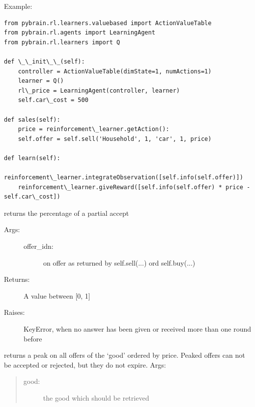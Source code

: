 \documentclass[letterpaper,10pt,english]{sphinxmanual}
\begin{document}
\begin{fulllineitems}
\begin{fulllineitems}
Example:

\begin{Verbatim}[commandchars=\\\{\}]
from pybrain.rl.learners.valuebased import ActionValueTable
from pybrain.rl.agents import LearningAgent
from pybrain.rl.learners import Q

def \_\_init\_\_(self):
    controller = ActionValueTable(dimState=1, numActions=1)
    learner = Q()
    rl\_price = LearningAgent(controller, learner)
    self.car\_cost = 500

def sales(self):
    price = reinforcement\_learner.getAction():
    self.offer = self.sell('Household', 1, 'car', 1, price)

def learn(self):
    reinforcement\_learner.integrateObservation([self.info(self.offer)])
    reinforcement\_learner.giveReward([self.info(self.offer) * price - self.car\_cost])
\end{Verbatim}

\end{fulllineitems}


\begin{fulllineitems}
\label{Trade:abce.Trade.partial_status_percentage}
returns the percentage of a partial accept
\begin{description}
\item[{Args:}] \leavevmode\begin{description}
\item[{offer\_idn:}] \leavevmode
on offer as returned by self.sell(...) ord self.buy(...)

\end{description}

\item[{Returns:}] \leavevmode
A value between {[}0, 1{]}

\item[{Raises:}] \leavevmode
KeyError, when no answer has been given or received more than one round before

\end{description}

\end{fulllineitems}


\begin{fulllineitems}
\label{Trade:abce.Trade.peak_offers}
returns a peak on all offers of the `good' ordered by price.
Peaked offers can not be accepted or rejected, but they do not
expire.
Args:
\begin{quote}
\begin{description}
\item[{good:}] \leavevmode
the good which should be retrieved


\end{description}
\end{quote}
\end{fulllineitems}
\end{fulllineitems}
\end{document}
